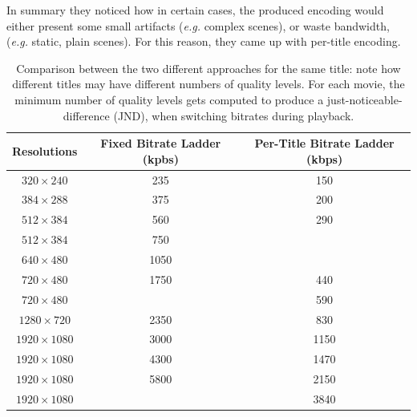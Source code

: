 In summary they noticed how in certain cases, the produced encoding would
either present some small artifacts (\emph{e.g.} complex scenes), or waste
bandwidth, (\emph{e.g.} static, plain scenes). For this reason, they came up
with per-title encoding.

\begin{table}[htb]
  \centering
  \begin{tabular}{|c|c|c|}
    \hline
    \textbf{Resolutions} & \textbf{Fixed Bitrate Ladder (kpbs)} & \textbf{Per-Title Bitrate Ladder (kbps)} \\
    \hline
    $320\times240$       & 235                                  & 150 \\
    \hline
    $384\times288$       & 375                                  & 200 \\
    \hline
    $512\times384$       & 560                                  & 290 \\
    \hline
    $512\times384$       & 750                                  & \\
    \hline
    $640\times480$       & 1050                                 & \\
    \hline
    $720\times480$       & 1750                                 & 440\\
    \hline
    $720\times480$       &                                      & 590\\
    \hline
    $1280\times720$      & 2350                                 & 830\\
    \hline
    $1920\times1080$     & 3000                                 & 1150\\
    \hline
    $1920\times1080$     & 4300                                 & 1470\\
    \hline
    $1920\times1080$     & 5800                                 & 2150\\
    \hline
    $1920\times1080$     &                                      & 3840\\
    \hline
  \end{tabular}
  \caption{
    Comparison between the two different approaches for the same title: note
    how different titles may have different numbers of quality levels. For each
    movie, the minimum number of quality levels gets computed to produce a
    just-noticeable-difference (JND), when switching bitrates during playback.
  }
  \label{tab:old-vs-new-ladder}
\end{table}

